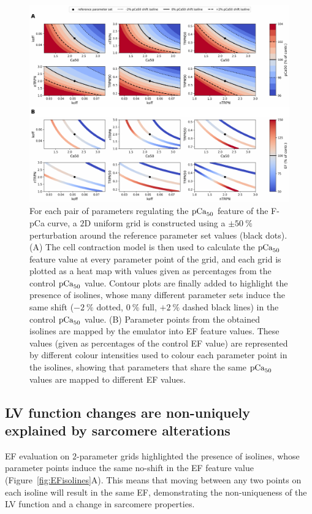 \begin{figure}[h!]
    \myfloatalign
    \includegraphics[width=\textwidth]{figures/chapter08/Fig5.pdf}
    \caption{For each pair of parameters regulating the $\textrm{pCa}_{50}$ feature of the F-pCa curve, a $2$D uniform grid is constructed using a $\pm\SI{50}{\percent}$ perturbation around the reference parameter set values (black dots). (A) The cell contraction model is then used to calculate the $\textrm{pCa}_{50}$ feature value at every parameter point of the grid, and each grid is plotted as a heat map with values given as percentages from the control $\textrm{pCa}_{50}$ value. Contour plots are finally added to highlight the presence of isolines, whose many different parameter sets induce the same shift ($-\SI{2}{\percent}$ dotted, $\SI{0}{\percent}$ full, $+\SI{2}{\percent}$ dashed black lines) in the control $\textrm{pCa}_{50}$ value. (B) Parameter points from the obtained isolines are mapped by the emulator into EF feature values. These values (given as percentages of the control EF value) are represented by different colour intensities used to colour each parameter point in the isolines, showing that parameters that share the same $\textrm{pCa}_{50}$ values are mapped to different EF values.}
    \label{fig:pca50isolines}
\end{figure}


%
%
%
\subsection{LV function changes are non-uniquely explained by sarcomere alterations}\label{sec:changesLVfunctionresult}
EF evaluation on $2$-parameter grids highlighted the presence of isolines, whose parameter points induce the same no-shift in the EF feature value (Figure~\ref{fig:EFisolines}A). This means that moving between any two points on each isoline will result in the same EF, demonstrating the non-uniqueness of the LV function and a change in sarcomere properties.


